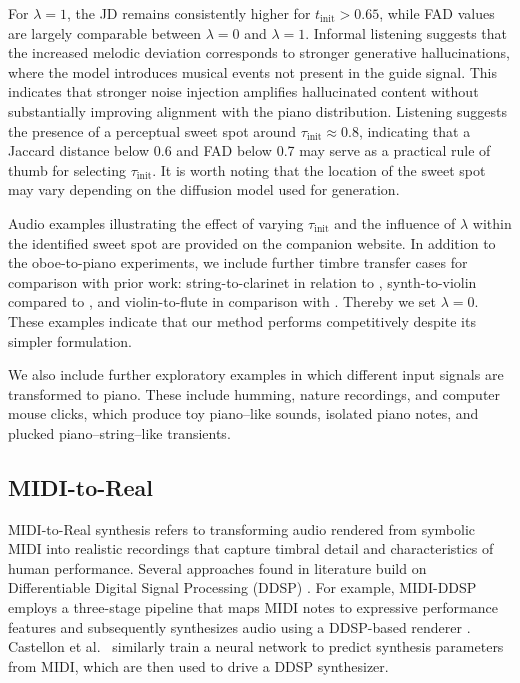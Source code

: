 \documentclass[twoside,a4paper]{article}
\begin{document}
For $\lambda = 1$, the JD remains consistently higher for  $t_\text{init}> 0.65$, while FAD values are largely comparable between $\lambda=0$ and $\lambda=1$. Informal listening suggests that the increased melodic deviation corresponds to stronger generative hallucinations, where the model introduces musical events not present in the guide signal. This indicates that stronger noise injection amplifies hallucinated content without substantially improving alignment with the piano distribution. Listening suggests the presence of a perceptual sweet spot around $\tau_\text{init}\approx 0.8$, indicating that a Jaccard distance below 0.6 and FAD below 0.7 may serve as a practical rule of thumb for selecting $\tau_\text{init}$.  It is worth noting that the location of the sweet spot may vary depending on the diffusion model used for generation.


Audio examples illustrating the effect of varying $\tau_\text{init}$ and the influence of $\lambda$ within the identified sweet spot are provided on the companion website. In addition to the oboe-to-piano experiments, we include further timbre transfer cases for comparison with prior work: string-to-clarinet in relation to \cite{baoueb2024wavetransferflexibleendtoendmultiinstrument, comanducci2023timbretransferusingimagetoimage}, synth-to-violin compared to \cite{lee2026diffusiontimbretransfermutual}, and violin-to-flute in comparison with \cite{mancusi2025latentdiffusionbridgesunsupervised}. Thereby we set $\lambda = 0$. These examples indicate that our method performs competitively despite its simpler formulation.

We also include further exploratory examples in which different input signals are transformed to piano. These include humming, nature recordings, and computer mouse clicks, which produce toy piano–like sounds, isolated piano notes, and plucked piano–string–like transients.

\subsection{MIDI-to-Real}
MIDI-to-Real synthesis refers to transforming audio rendered from symbolic MIDI into realistic recordings that capture timbral detail and characteristics of human performance. Several approaches found in literature build on Differentiable Digital Signal Processing (DDSP) \cite{engel2020ddspdifferentiabledigitalsignal}. For example, MIDI-DDSP employs a three-stage pipeline that maps MIDI notes to expressive performance features and subsequently synthesizes audio using a DDSP-based renderer \cite{wu2022mididdspdetailedcontrolmusical}. Castellon et al.~\cite{castellonRealisticMIDIInstrument} similarly train a neural network to predict synthesis parameters from MIDI, which are then used to drive a DDSP synthesizer. 
\end{document}
